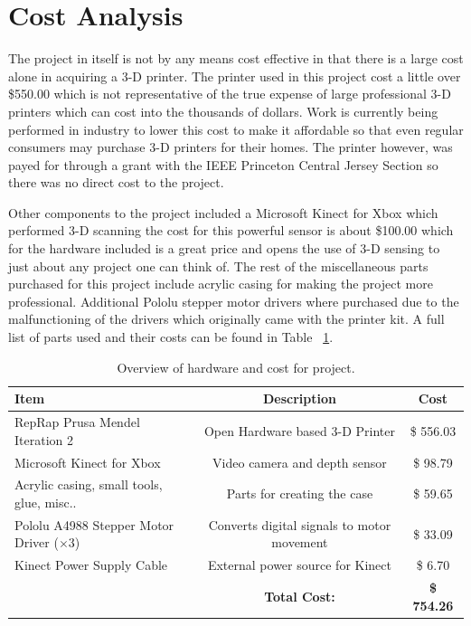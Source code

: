 \documentclass[pdftex,10.5pt]{report}
\begin{document}
\section{Cost Analysis}
The project in itself is not by any means cost effective in that there is a large cost alone in acquiring a 3-D printer. The printer used in this project cost a little over \$550.00 which is not representative of the true expense of large professional 3-D printers which can cost into the thousands of dollars. Work is currently being performed in industry to lower this cost to make it affordable so that even regular consumers may purchase 3-D printers for their homes. \cite{cite9} The printer however, was payed for through a grant with the IEEE Princeton Central Jersey Section so there was no direct cost to the project.

Other components to the project included a Microsoft Kinect for Xbox which performed 3-D scanning the cost for this powerful sensor is about \$100.00 which for the hardware included is a great price and opens the use of 3-D sensing to just about any project one can think of. The rest of the miscellaneous parts purchased for this project include acrylic casing for making the project more professional. Additional Pololu stepper motor drivers where purchased due to the malfunctioning of the drivers which originally came with the printer kit. A full list of parts used and their costs can be found in Table ~\ref{tab:costs}.

\begin{table}[h]
	\centering
 	\begin{tabular}{|l|c|c|}
		\hline
		\textbf{Item} & \textbf{Description} & \textbf{Cost} \\
		\hline
 		RepRap Prusa Mendel Iteration 2 & Open Hardware based 3-D Printer& \$ 556.03\\
		Microsoft Kinect for Xbox & Video camera and depth sensor & \$ 98.79 \\
		Acrylic casing, small tools, glue, misc.. & Parts for creating the case & \$ 59.65 \\
		Pololu A4988 Stepper Motor Driver ($\times 3$)   & Converts digital signals to motor movement & \$ 33.09 \\
		Kinect Power Supply Cable & External power source for Kinect & \$ 6.70 \\
		\hline
		& \textbf{Total Cost:} & \textbf{\$  754.26} \\
		\hline
	\end{tabular}
	\caption{
	Overview of hardware and cost for project.
	}	
\label{tab:costs}
\end{table}
\end{document}
